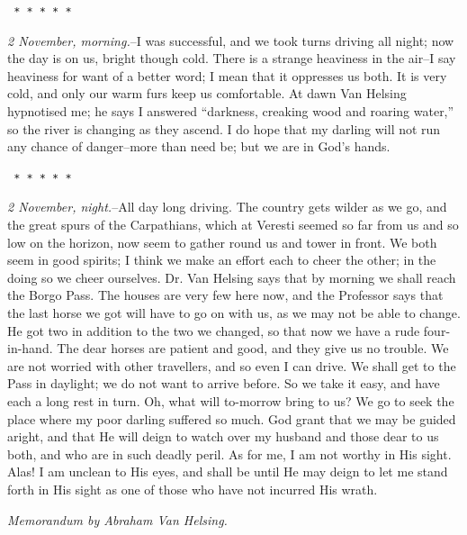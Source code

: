 \documentclass[12pt,openright]{book}
\begin{document}
\texttt{   *       *       *       *       *}

\textit{2 November, morning.}–I was successful, and we took turns driving all night; now the day is on us, bright though cold. There is a strange heaviness in the air–I say heaviness for want of a better word; I mean that it oppresses us both. It is very cold, and only our warm furs keep us comfortable. At dawn Van Helsing hypnotised me; he says I answered “darkness, creaking wood and roaring water,” so the river is changing as they ascend. I do hope that my darling will not run any chance of danger–more than need be; but we are in God’s hands.

\texttt{   *       *       *       *       *}

\textit{2 November, night.}–All day long driving. The country gets wilder as we go, and the great spurs of the Carpathians, which at Veresti seemed so far from us and so low on the horizon, now seem to gather round us and tower in front. We both seem in good spirits; I think we make an effort each to cheer the other; in the doing so we cheer ourselves. Dr. Van Helsing says that by morning we shall reach the Borgo Pass. The houses are very few here now, and the Professor says that the last horse we got will have to go on with us, as we may not be able to change. He got two in addition to the two we changed, so that now we have a rude four-in-hand. The dear horses are patient and good, and they give us no trouble. We are not worried with other travellers, and so even I can drive. We shall get to the Pass in daylight; we do not want to arrive before. So we take it easy, and have each a long rest in turn. Oh, what will to-morrow bring to us? We go to seek the place where my poor darling suffered so much. God grant that we may be guided aright, and that He will deign to watch over my husband and those dear to us both, and who are in such deadly peril. As for me, I am not worthy in His sight. Alas! I am unclean to His eyes, and shall be until He may deign to let me stand forth in His sight as one of those who have not incurred His wrath.

\textit{Memorandum by Abraham Van Helsing.}
\end{document}
